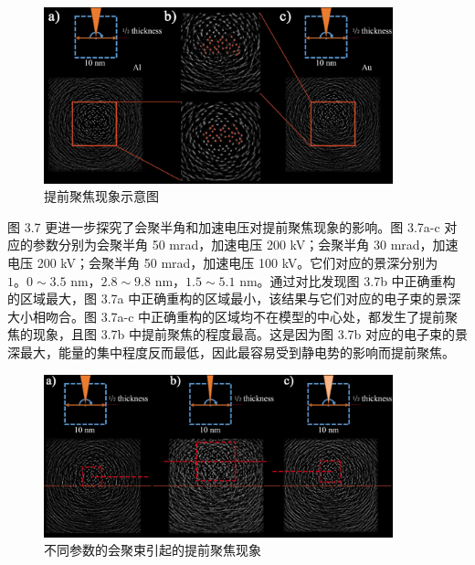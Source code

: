 \begin{figure}[H]
	\vspace{\baselineskip}
	\centering
	\includegraphics[width=0.9\textwidth]{../4.6/46}
	\caption{提前聚焦现象示意图}\label{fig:45}
	\song{}
\end{figure}


图 3.7 更进一步探究了会聚半角和加速电压对提前聚焦现象的影响。图 3.7a-c 对应的参数分别为会聚半角 50 mrad，加速电压 200 kV；会聚半角 30 mrad，加速电压 200 kV；会聚半角 50 mrad，加速电压 100 kV。它们对应的景深分别为 $1。0\sim3.5$ nm，$2.8\sim9.8$ nm，$1.5\sim5.1$ nm。通过对比发现图 3.7b 中正确重构的区域最大，图 3.7a 中正确重构的区域最小，该结果与它们对应的电子束的景深大小相吻合。图 3.7a-c 中正确重构的区域均不在模型的中心处，都发生了提前聚焦的现象，且图 3.7b 中提前聚焦的程度最高。这是因为图 3.7b 对应的电子束的景深最大，能量的集中程度反而最低，因此最容易受到静电势的影响而提前聚焦。

\begin{figure}[htbp]
	\vspace{\baselineskip}
	\centering
	\includegraphics[width=0.9\textwidth]{../4.7/47}
	\caption{不同参数的会聚束引起的提前聚焦现象}\label{fig:46}
	\song{}
\end{figure}


